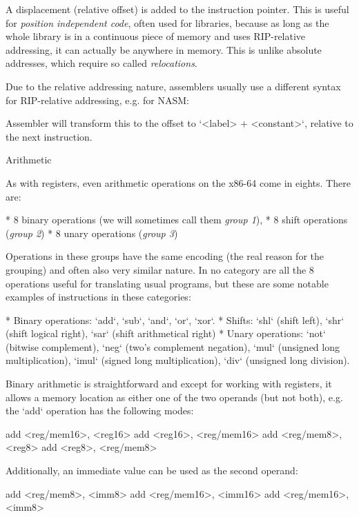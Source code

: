 \begtt \optparams
[ip + <displacement>]
\endtt
%
A displacement (relative offset) is added to the instruction pointer. This is
useful for {\em position independent code}, often used for libraries, because as long
as the whole library is in a continuous piece of memory and uses RIP-relative
addressing, it can actually be anywhere in memory. This is unlike absolute
addresses, which require so called {\em relocations}.

Due to the relative addressing nature, assemblers usually use a different syntax
for RIP-relative addressing, e.g. for NASM:

\begtt {}
\endtt

Assembler will transform this to the offset to `<label> + <constant>`, relative to the next
instruction.
\enditems

\secc Arithmetic

As with registers, even arithmetic operations on the x86-64 come in eights.
There are:

\begitems
 * 8 binary operations (we will sometimes call them {\em group 1}),
 * 8 shift operations ({\em group 2})
 * 8 unary operations ({\em group 3})
\enditems

Operations in these groups have the same encoding (the real reason for the
grouping) and often also very similar nature. In no category are all
the 8 operations useful for translating usual programs, but these are some
notable examples of instructions in these categories:

\begitems
* Binary operations: `add`, `sub`, `and`, `or`, `xor`.
* Shifts: `shl` (shift left), `shr` (shift logical right), `sar` (shift
arithmetical right)
* Unary operations: `not` (bitwise complement), `neg` (two's complement
negation), `mul` (unsigned long multiplication), `imul` (signed long multiplication),
`div` (unsigned long division).
\enditems

Binary arithmetic is straightforward and except for working with registers, it
allows a memory location as either one of the two operands (but not both), e.g.
the `add` operation has the following modes:

\begtt \optparams
add <reg/mem16>, <reg16>
add <reg16>, <reg/mem16>
add <reg/mem8>, <reg8>
add <reg8>, <reg/mem8>
\endtt

Additionally, an immediate value can be used as the second operand:

\begtt \optparams
add <reg/mem8>, <imm8>
add <reg/mem16>, <imm16>
add <reg/mem16>, <imm8>
\endtt

